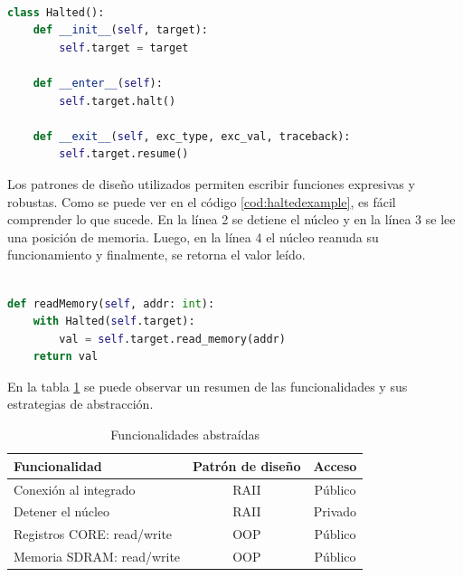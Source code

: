 \begin{lstlisting}[language=Python,label=cod:halted,caption=Ejemplo de \emph{Resource Acquisition Is Initialization (RAII)}.]  % Start your code-block

class Halted():
    def __init__(self, target):
        self.target = target

    def __enter__(self):
        self.target.halt()

    def __exit__(self, exc_type, exc_val, traceback):
        self.target.resume()

\end{lstlisting}

Los patrones de diseño utilizados permiten escribir funciones expresivas y robustas.
Como se puede ver en el código \ref{cod:haltedexample}, es fácil comprender lo que sucede.
En la línea 2 se detiene el núcleo y en la línea 3 se lee una posición de memoria.
Luego, en la línea 4 el núcleo reanuda su funcionamiento y finalmente, se retorna el valor leído.

\newpage

\begin{lstlisting}[language=Python,label=cod:haltedexample,caption=Ejemplo de uso de \emph{RAII}.]  % Start your code-block

def readMemory(self, addr: int):
    with Halted(self.target):
        val = self.target.read_memory(addr)
    return val

\end{lstlisting}

En la tabla \ref{tab:funcionalidades} se puede observar un resumen de las funcionalidades y sus estrategias de abstracción.

\begin{table}[h]
	\centering
	\caption[Funcionalidades abstraidas]{Funcionalidades abstraídas}

	\begin{tabular}{l c c}    
		\toprule
        \textbf{Funcionalidad}     & \textbf{Patrón de diseño} & \textbf{Acceso}\\
		\midrule
		Conexión al integrado      & RAII                      & Público\\		
		Detener el núcleo          & RAII                      & Privado\\
		Registros CORE: read/write & OOP                       & Público\\
		Memoria SDRAM: read/write  & OOP                       & Público\\
		\bottomrule
		\hline
	\end{tabular}
	\label{tab:funcionalidades}
\end{table}

